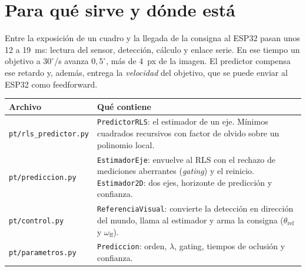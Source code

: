 \documentclass[11pt,a4paper]{article}
\newcommand{\cod}[1]{\texttt{#1}}
\newcommand{\lam}{\lambda}
\newcommand{\gr}{^{\circ}}
\begin{document}
\section{Para qué sirve y dónde está}

Entre la exposición de un cuadro y la llegada de la consigna al ESP32 pasan unos 12 a 19~ms: lectura del
sensor, detección, cálculo y enlace serie. En ese tiempo un objetivo a $30\gr$/s avanza $0{,}5\gr$, más de
4~px de la imagen. El predictor compensa ese retardo y, además, entrega la \emph{velocidad} del objetivo,
que se puede enviar al ESP32 como feedforward.

\begin{table}[H]
\centering\small
\begin{tabularx}{\linewidth}{@{}l>{\raggedright\arraybackslash}X@{}}
\toprule
Archivo & Qué contiene \\
\midrule
\cod{pt/rls\_predictor.py} & \cod{PredictorRLS}: el estimador de un eje. Mínimos cuadrados recursivos con factor de olvido sobre un polinomio local. \\
\cod{pt/prediccion.py} & \cod{EstimadorEje}: envuelve al RLS con el rechazo de mediciones aberrantes (\emph{gating}) y el reinicio. \cod{Estimador2D}: dos ejes, horizonte de predicción y confianza. \\
\cod{pt/control.py} & \cod{ReferenciaVisual}: convierte la detección en dirección del mundo, llama al estimador y arma la consigna ($\theta_{\mathrm{ref}}$ y $\omega_{\mathrm{ff}}$). \\
\cod{pt/parametros.py} & \cod{Prediccion}: orden, $\lam$, gating, tiempos de oclusión y confianza. \\
\bottomrule
\end{tabularx}
\end{table}
\end{document}
